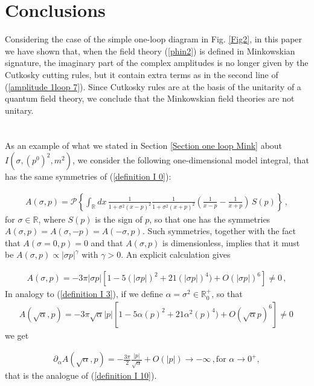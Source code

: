 \documentclass[a4paper,11pt]{article}
\newcommand{\be}{\begin{eqnarray}}
\newcommand{\ee}{\end{eqnarray}}
\begin{document}
\section{Conclusions}\label{Section conclusions}

Considering the case of the simple one-loop diagram in Fig. \ref{Fig2}, in this paper we have shown that, when the field theory (\ref{phin2}) is defined in  Minkowskian signature, the imaginary part of the complex amplitudes is no longer given by the Cutkosky cutting rules, but it contain extra terms as in the second line of (\ref{amplitude 1loop 7}). Since Cutkosky rules are at the basis of the unitarity of a quantum field theory, we conclude that the Minkowskian field theories are not unitary.



\appendix

\section{}\label{appendix}


As an example of what we stated in Section \ref{Section one loop Mink} about $I(\sigma,(p^0)^2,m^2)$, we consider the following one-dimensional model integral, that has the same symmetries of (\ref{definition I 0}):


\be\label{example A}
A(\sigma,p)= \mathcal{P} \left\{ \int_\mathbb{R} dx\, \frac{1}{1+\sigma^2 (x-p)^2}\frac{1}{1+\sigma^2 (x+p)^2} \left(\frac{1}{x-p}-\frac{1}{x+p}\right)\, S(p)\right\}  \, ,
\ee
for $\sigma \in \mathbb{R}$, where $S(p)$ is the sign of $p$, so that one has the symmetries $A(\sigma,p) = A(\sigma,-p)=A(-\sigma,p)$. Such symmetries, together with the fact that $A(\sigma=0,p) = 0$ and that $A(\sigma,p)$ is dimensionless, implies that it must be $A(\sigma,p) \propto |\sigma p|^\gamma$ with $\gamma>0$. An explicit calculation gives

\be\label{example A 2}
A(\sigma,p)= - 3  \pi |\sigma p|  \left[1-5 (|\sigma p|)^2+21 (|\sigma p|)^4)+O(|\sigma p|)^6\right] \neq 0 \, ,
\ee
In analogy to (\ref{definition I 3}), if we define $\alpha = \sigma^2 \in \mathbb{R}^+_0$, so that
\be\label{example A 3}
A(\sqrt{\alpha},p)= - 3  \pi \sqrt{\alpha} |p|  \left[1-5 \alpha (p)^2+21 \alpha^2(p)^4)+O(\sqrt{\alpha} p)^6\right] \neq 0 \, 
\ee
we get

\be\label{example A 4}
\partial_\alpha A(\sqrt{\alpha},p) = - \frac{3  \pi}{2} \frac{|p|}{\sqrt{\alpha}}+ O(|p|) \rightarrow - \infty \, ,
\text{for}  \,\, \alpha \rightarrow 0^+ ,  
\ee
that is the analogue of (\ref{definition I 10}).
\end{document}
